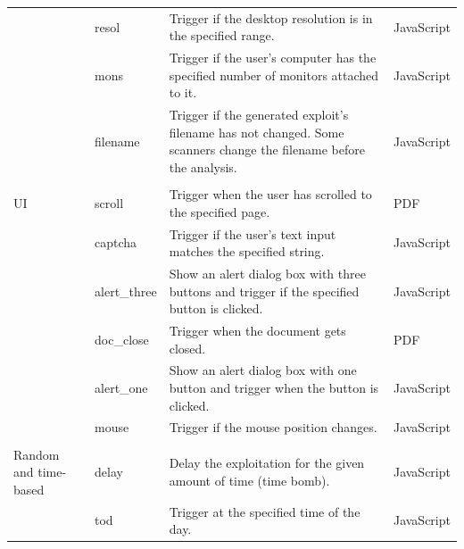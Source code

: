 \begin{table}[t]
\begin{tabular}{@{}p{6em}p{6em}p{39em}p{7.5em}@{}}
                          & resol & Trigger if the desktop resolution is 
                          in the specified range. & JavaScript \\
                          
                          & mons & Trigger if the user's computer has the specified 
                          number of monitors attached to it. & JavaScript  \\

                          & filename & Trigger if the generated exploit's 
                          filename has not changed. Some scanners change the filename before the analysis. & JavaScript \\

\\
UI                        & scroll & Trigger when the user has scrolled 
                            to the specified page. & PDF \\

                            & captcha & Trigger if the user's text 
                            input matches the specified string. & JavaScript \\
                            
                            & alert\_three & Show an alert dialog box with 
                            three buttons and trigger if the specified                       
                            button is clicked. & JavaScript \\
                
                            & doc\_close & Trigger when the document gets 
                            closed. & PDF  \\
                            
                            & alert\_one & Show an alert dialog box with one                                
button and trigger when the button is clicked. & JavaScript \\
                            
                            & mouse & Trigger if the mouse position 
                            changes. & JavaScript \\
\\
Random and time-based   & delay & Delay the exploitation for the                                
given amount of time (time bomb). & JavaScript \\

                            & tod & Trigger at the specified time of the day. & JavaScript  
                            \\

\bottomrule
\end{tabular}
\end{table}


